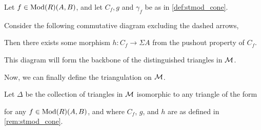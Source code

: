 \begin{remark}
    \label{rem:stmod_cone}
    Let \( f \in \operatorname{Mod}(R)(A, B) \), and let \( C_f, g \) and \( \gamma_f \) be as in \autoref{def:stmod_cone}.
    
    Consider the following commutative diagram excluding the dashed arrows,
    \begin{center}
    \end{center}
    Then there exists some morphism \( h: C_f \to \Sigma A \) from the pushout property of \( C_f \).

    This diagram will form the backbone of the distinguished triangles in \( {\mathcal{M}} \).
\end{remark}

Now, we can finally define the triangulation on \( {\mathcal{M}} \).

\begin{definition}
    \label{def:stmod_delta}
    Let \( \Delta \) be the collection of triangles in \( {\mathcal{M}} \) isomorphic to any triangle of the form
    \begin{center}
    \end{center}
    for any \( f \in \operatorname{Mod}(R)(A, B) \), and where \( C_f \), \( g \), and \( h \) are as defined in \autoref{rem:stmod_cone}.
\end{definition}

